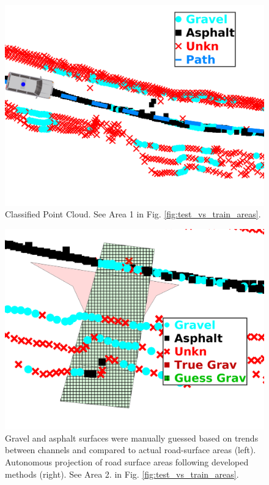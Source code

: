 \documentclass[journal,onecolumn]{IEEEtran}
\begin{document}
			\begin{figure}[H]
				\centering
				\includegraphics[width=0.75\linewidth]{figures/db1range_3.png}
				\caption[Classified Point Cloud]{Classified Point Cloud. See Area 1 in Fig. \ref{fig:test_vs_train_areas}.}
				\label{fig:raw_classification_results}
			\end{figure}

			\begin{figure}[H]
				\centering
				\includegraphics[width=0.75\linewidth]{figures/rm_db_6_overlap_2}
				\caption[Projected Guess vs Truth]{Gravel and asphalt surfaces were manually guessed based on trends between channels and compared to actual road-surface areas (left). Autonomous projection of road surface areas following developed methods (right). See Area 2. in Fig. \ref{fig:test_vs_train_areas}.}
				\label{fig:rm_db_6_overlap_2}
			\end{figure}
\end{document}
